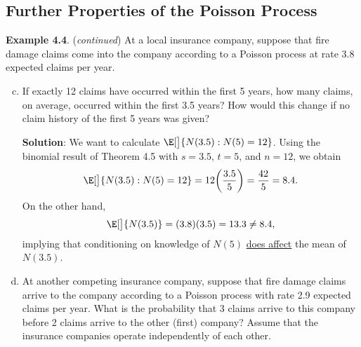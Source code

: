 \subsection*{Further Properties of the Poisson Process}
\begin{Example}
    \textbf{Example 4.4}. (\emph{continued}) At a local insurance company, suppose that fire damage claims
    come into the company according to a Poisson process at rate 3.8 expected claims per year.
    \begin{enumerate}[(a)]
        \setcounter{enumi}{2}
        \item If exactly 12 claims have occurred within the first 5 years, how many claims, on average,
              occurred within the first 3.5 years? How would this change if no claim history of the first 5
              years was given?

              \textbf{Solution}: We want to calculate $ \E[\big]{N(3.5)\given N(5)=12} $.
              Using the binomial result of Theorem 4.5 with $ s=3.5 $, $ t=5 $,
              and $ n=12 $, we obtain
              \[ \E[\big]{N(3.5)\given N(5)=12}=12\biggl(\frac{3.5}{5}\biggr)=\frac{42}{5}= 8.4. \]
              On the other hand,
              \[ \E[\big]{N(3.5)}=(3.8)(3.5)=13.3\ne 8.4, \]
              implying that conditioning on knowledge of $ N(5) $
              \underline{does affect} the mean of $ N(3.5) $.

        \item At another competing insurance company, suppose that fire damage claims arrive to the
              company according to a Poisson process with rate 2.9 expected claims per year. What is the
              probability that 3 claims arrive to this company before 2 claims arrive to the other (first)
              company? Assume that the insurance companies operate independently of each other.


\end{enumerate}
\end{Example}
